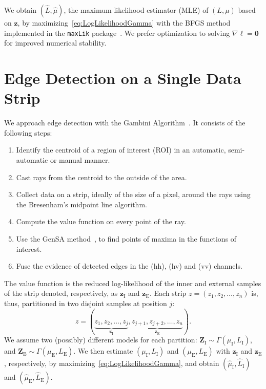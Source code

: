 \documentclass[journal]{IEEEtran}
\begin{document}
We obtain $(\widehat L, \widehat \mu)$, the maximum likelihood estimator (MLE) of $(L, \mu)$ based on $\bm z$, by maximizing~\eqref{eq:LogLikelihoodGamma} with the BFGS method implemented in the \texttt{maxLik} package~\cite{ht}.
We prefer optimization to solving $\nabla\ell=\bm 0$ for improved numerical stability.

\section{Edge Detection on a Single Data Strip}\label{sec_03}

We approach edge detection with the Gambini Algorithm~\cite{gmbf, fbgm, nhfc}.
It consists of the following steps:
\begin{enumerate}
	\item Identify the centroid of a region of interest (ROI) in an automatic, semi-automatic or manual manner.
	\item Cast rays from the centroid to the outside of the area.
	\item Collect data on a strip, ideally of the size of a pixel, around the rays using the  Bresenham's midpoint line algorithm.
	\item Compute the value function on every point of the ray.
	\item Use the GenSA method~\cite{xgsh}, to find points of maxima in the functions of interest.
	\item Fuse the evidence of detected edges in the (hh), (hv) and (vv) channels.
\end{enumerate}

The value function is the reduced log-likelihood of the inner and external samples of the strip denoted, respectively, as $\bm z_\text{I}$ and $\bm z_\text{E}$.
Each strip $z = (z_1,z_2,\dots,z_n)$ is, thus, partitioned in two disjoint samples at position $j$:
$$
z = (\underbrace{z_1,z_2,\dots,z_j}_{\bm z_\text{I}}, 
\underbrace{z_{j+1}, z_{j+2},\dots,z_n}_{\bm z_\text{E}}).
$$
We assume two (possibly) different models for each partition:
$\bm Z_\text{I} \sim \Gamma(\mu_\text{I},L_\text{I})$, and 
$\bm Z_\text{E} \sim \Gamma(\mu_\text{E},L_\text{E})$.
We then estimate $(\mu_\text{I},L_\text{I})$ and $(\mu_\text{E},L_\text{E})$ with $\bm z_\text{I}$ and $\bm z_\text{E}$, respectively, by maximizing~\eqref{eq:LogLikelihoodGamma}, and obtain $(\widehat{\mu}_\text{I}, \widehat{L}_\text{I})$ and $(\widehat{\mu}_\text{E}, \widehat{L}_\text{E})$.
\end{document}
